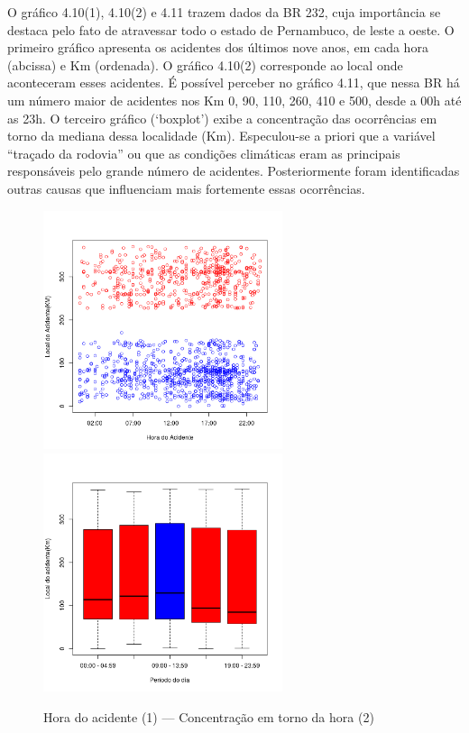 O gráfico 4.10(1), 4.10(2)  e 4.11 trazem dados da BR 232, cuja importância se destaca pelo fato de atravessar todo o estado de Pernambuco, de leste a oeste. O primeiro gráfico apresenta os acidentes dos últimos nove anos, em cada hora (abcissa) e Km (ordenada). O  gráfico 4.10(2) corresponde ao local onde aconteceram esses acidentes. É possível perceber no gráfico 4.11, que nessa BR há um número maior de acidentes nos Km 0, 90, 110, 260, 410 e 500, desde a 00h até as 23h. O terceiro gráfico (‘boxplot’) exibe a concentração das ocorrências em torno da mediana dessa localidade (Km). 
Especulou-se a priori que a variável “traçado da rodovia” ou que as condições climáticas eram as principais responsáveis pelo grande número de acidentes. Posteriormente foram identificadas outras causas que influenciam mais fortemente essas ocorrências. 



\pagebreak

\begin{figure}[h]
	\caption{Hora do acidente (1) --- Concentração em torno da hora (2)}
	\includegraphics[width=7cm,height=7cm]{Figuras/Preprocess/br316_1.png}
	\includegraphics[width=7cm,height=7cm]{Figuras/Preprocess/br316_2.png}

\end{figure}

